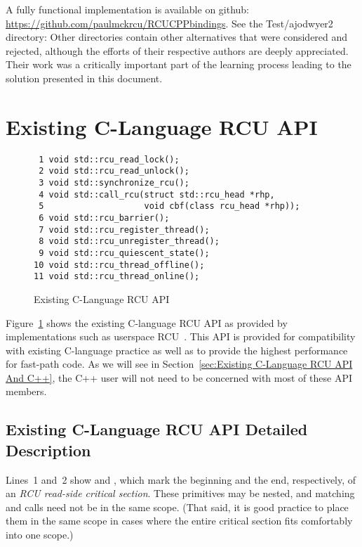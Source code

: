 \documentclass[letterpaper,10pt]{article}
\begin{document}
A fully functional implementation is available on github:
\url{https://github.com/paulmckrcu/RCUCPPbindings}.
See the Test/ajodwyer2 directory: Other directories contain other
alternatives that were considered and rejected, although the efforts
of their respective authors are deeply appreciated.
Their work was a critically important part of the learning process
leading to the solution presented in this document.

\section{Existing C-Language RCU API}
\label{sec:Existing C-Language RCU API}

\begin{figure}[tbp]
{ \scriptsize
\begin{verbatim}
 1 void std::rcu_read_lock();
 2 void std::rcu_read_unlock();
 3 void std::synchronize_rcu();
 4 void std::call_rcu(struct std::rcu_head *rhp,
 5                    void cbf(class rcu_head *rhp));
 6 void std::rcu_barrier();
 7 void std::rcu_register_thread();
 8 void std::rcu_unregister_thread();
 9 void std::rcu_quiescent_state();
10 void std::rcu_thread_offline();
11 void std::rcu_thread_online();
\end{verbatim}
}
\caption{Existing C-Language RCU API}
\label{fig:Existing C-Language RCU API}
\end{figure}

Figure~\ref{fig:Existing C-Language RCU API}
shows the existing C-language RCU API as provided by implementations such as
userspace RCU~\cite{MathieuDesnoyers2009URCU,PaulMcKenney2013LWNURCU}.
This API is provided for compatibility with existing C-language practice as
well as to provide the highest performance for fast-path code.
As we will see in
Section~\ref{sec:Existing C-Language RCU API And C++},
the C++ user will not need to be concerned with most
of these API members.

\subsection{Existing C-Language RCU API Detailed Description}
\label{sec:Existing C-Language RCU API Detailed Description}

Lines~1 and~2 show  and ,
which mark the beginning and the end, respectively, of an \emph{RCU read-side
critical section}.
These primitives may be nested, and matching 
and  calls need not be in the same scope.
(That said, it is good practice to place them in the same scope
in cases where the entire critical section fits comfortably into
one scope.)
\end{document}
